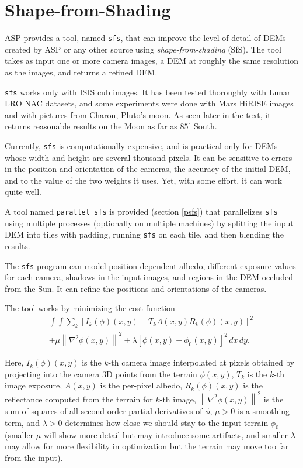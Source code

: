 \chapter{Shape-from-Shading}
\label{ch:sfs}

ASP provides a tool, named \texttt{sfs}, that can improve the level of
detail of DEMs created by ASP or any other source using
\textit{shape-from-shading} (SfS). The tool takes as input one or more
camera images, a DEM at roughly the same resolution as the images, and
returns a refined DEM.

\texttt{sfs} works only with ISIS cub images. It has been tested
thoroughly with Lunar LRO NAC datasets, and some experiments were done
with Mars HiRISE images and with pictures from Charon, Pluto's moon. As
seen later in the text, it returns reasonable results on the Moon as far
as $85^\circ$ South.

Currently, \texttt{sfs} is computationally expensive, and is practical
only for DEMs whose width and height are several thousand pixels. It can be 
sensitive to errors in the position and orientation of the cameras, the
accuracy of the initial DEM, and to the value of the two weights it uses.
Yet, with some effort, it can work quite well. 

A tool named \texttt{parallel\_sfs} is provided (section \ref{psfs}) 
that parallelizes \texttt{sfs} using multiple processes (optionally on
multiple machines) by splitting the input DEM into tiles with padding,
running \texttt{sfs} on each tile, and then blending the results. 

The \texttt{sfs} program can model position-dependent albedo, different
exposure values for each camera, shadows in the input images, and regions
in the DEM occluded from the Sun. It can refine the positions and orientations
of the cameras.

The tool works by minimizing the cost function
\begin{multline}\label{cost}
\int\!\! \int \! \sum_k \left[ I_k(\phi)(x, y) - T_k A(x, y)
 R_k(\phi)(x, y) \right]^2\,  \\
+ \mu \left\|\nabla^2 \phi(x, y) \right\|^2  
+ \lambda  \left[ \phi(x, y) - \phi_0(x, y) \right]^2
\, dx\, dy.
\end{multline}

Here, $I_k(\phi)(x, y)$ is the $k$-th camera image interpolated at
pixels obtained by projecting into the camera 3D points from the terrain
$\phi(x, y)$, $T_k$ is the $k$-th image exposure, $A(x, y)$ is the
per-pixel albedo, $R_k(\phi)(x, y)$ is the reflectance computed from the
terrain for $k$-th image, $\left\|\nabla^2 \phi(x, y) \right\|^2 $ is the sum
of squares of all second-order partial derivatives of $\phi$, $\mu > 0$
is a smoothing term, and $\lambda > 0$ determines how close we should
stay to the input terrain $\phi_0$ (smaller $\mu$ will show more detail
but may introduce some artifacts, and smaller $\lambda$ may allow for
more flexibility in optimization but the terrain may move too far from the input). 

